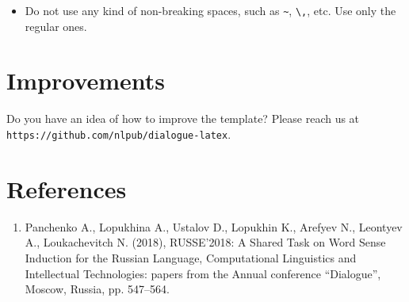 \documentclass{dialogue}
\begin{document}
\begin{itemize}
  \item Do not use any kind of non-breaking spaces, such as \verb|~|, \verb|\,|, etc. Use only the regular ones.
\end{itemize}

\section{Improvements}

Do you have an idea of how to improve the template? Please reach us at\\\texttt{https://github.com/nlpub/dialogue-latex}.

\color{blue}\section*{References}

\begin{enumerate}
  \item Panchenko A., Lopukhina A., Ustalov D., Lopukhin K., Arefyev N., Leontyev A., Loukachevitch N. (2018), RUSSE'2018: A Shared Task on Word Sense Induction for the Russian Language, Computational Linguistics and Intellectual Technologies: papers from the Annual conference ``Dialogue'', Moscow, Russia, pp. 547--564.
\end{enumerate}


\end{document}
